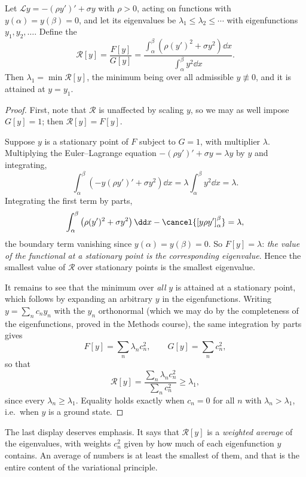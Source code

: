 \begin{theorem}\label{thm:rayleigh}
	Let $\mathcal{L}y = -(\rho y')' + \sigma y$ with $\rho > 0$, acting on functions with $y(\alpha) = y(\beta) = 0$, and let its eigenvalues be $\lambda_1 \leq \lambda_2 \leq \cdots$ with eigenfunctions $y_1, y_2, \dots$. Define the 
	$$
	\mathcal{R}[y] = \frac{F[y]}{G[y]} = \frac{\displaystyle\int_\alpha^\beta \left(\rho (y')^2 + \sigma y^2\right)\dd x}{\displaystyle\int_\alpha^\beta y^2 \dd x}.
	$$
	Then $\lambda_1 = \min \mathcal{R}[y]$, the minimum being over all admissible $y \not\equiv 0$, and it is attained at $y = y_1$.
\end{theorem}
\begin{proof}
	First, note that $\mathcal{R}$ is unaffected by scaling $y$, so we may as well impose $G[y] = 1$; then $\mathcal{R}[y] = F[y]$.

	Suppose $y$ is a stationary point of $F$ subject to $G = 1$, with multiplier $\lambda$. Multiplying the Euler--Lagrange equation $-(\rho y')' + \sigma y = \lambda y$ by $y$ and integrating,
	$$
	\int_\alpha^\beta\left(-y(\rho y')' + \sigma y^2\right)\dd x = \lambda \int_\alpha^\beta y^2\dd x = \lambda.
	$$
	Integrating the first term by parts,
	$$
	\int_\alpha^\beta \left(\rho (y')^2 + \sigma y^2\right)\dd x - \cancel{\left[y\rho y'\right]_\alpha^\beta} = \lambda,
	$$
	the boundary term vanishing since $y(\alpha) = y(\beta) = 0$. So $F[y] = \lambda$: \emph{the value of the functional at a stationary point is the corresponding eigenvalue}. Hence the smallest value of $\mathcal{R}$ over stationary points is the smallest eigenvalue.

	It remains to see that the minimum over \emph{all} $y$ is attained at a stationary point, which follows by expanding an arbitrary $y$ in the eigenfunctions. Writing $y = \sum_n c_n y_n$ with the $y_n$ orthonormal (which we may do by the completeness of the eigenfunctions, proved in the Methods course), the same integration by parts gives
	$$
	F[y] = \sum_n \lambda_n c_n^2, \qquad G[y] = \sum_n c_n^2,
	$$
	so that
	$$
	\mathcal{R}[y] = \frac{\sum_n \lambda_n c_n^2}{\sum_n c_n^2} \geq \lambda_1,
	$$
	since every $\lambda_n \geq \lambda_1$. Equality holds exactly when $c_n = 0$ for all $n$ with $\lambda_n > \lambda_1$, i.e.\ when $y$ is a ground state.
\end{proof}

The last display deserves emphasis. It says that $\mathcal{R}[y]$ is a \emph{weighted average} of the eigenvalues, with weights $c_n^2$ given by how much of each eigenfunction $y$ contains. An average of numbers is at least the smallest of them, and that is the entire content of the variational principle.

